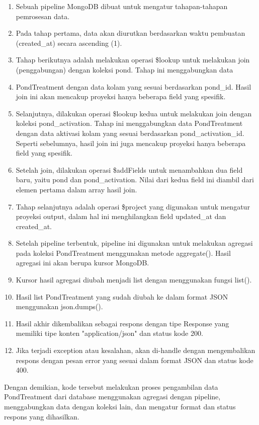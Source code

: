 \begin{enumerate}[1.]
\begin{enumerate}
\item Sebuah pipeline MongoDB dibuat untuk mengatur tahapan-tahapan pemrosesan data.
\item Pada tahap pertama, data akan diurutkan berdasarkan waktu pembuatan (created\_at) secara ascending (1).
\item Tahap berikutnya adalah melakukan operasi \$lookup untuk melakukan join (penggabungan) dengan koleksi pond. Tahap ini menggabungkan data \item PondTreatment dengan data kolam yang sesuai berdasarkan pond\_id. Hasil join ini akan mencakup proyeksi hanya beberapa field yang spesifik.
\item Selanjutnya, dilakukan operasi \$lookup kedua untuk melakukan join dengan koleksi pond\_activation. Tahap ini menggabungkan data PondTreatment dengan data aktivasi kolam yang sesuai berdasarkan pond\_activation\_id. Seperti sebelumnya, hasil join ini juga mencakup proyeksi hanya beberapa field yang spesifik.
\item Setelah join, dilakukan operasi \$addFields untuk menambahkan dua field baru, yaitu pond dan pond\_activation. Nilai dari kedua field ini diambil dari elemen pertama dalam array hasil join.
\item Tahap selanjutnya adalah operasi \$project yang digunakan untuk mengatur proyeksi output, dalam hal ini menghilangkan field updated\_at dan created\_at.
\item Setelah pipeline terbentuk, pipeline ini digunakan untuk melakukan agregasi pada koleksi PondTreatment menggunakan metode aggregate(). Hasil agregasi ini akan berupa kursor MongoDB.
\item Kursor hasil agregasi diubah menjadi list dengan menggunakan fungsi list().
\item Hasil list PondTreatment yang sudah diubah ke dalam format JSON menggunakan json.dumps().
\item Hasil akhir dikembalikan sebagai respons dengan tipe Response yang memiliki tipe konten "application/json" dan status kode 200.
\item Jika terjadi exception atau kesalahan, akan di-handle dengan mengembalikan respons dengan pesan error yang sesuai dalam format JSON dan status kode 400.
\end{enumerate}
Dengan demikian, kode tersebut melakukan proses pengambilan data PondTreatment dari database menggunakan agregasi dengan pipeline, menggabungkan data dengan koleksi lain, dan mengatur format dan status respons yang dihasilkan.


\end{enumerate}
